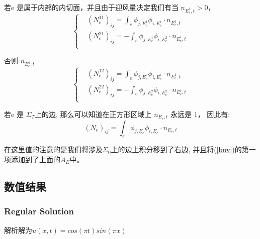 若e 是属于内部的内切面，并且由于迎风量决定我们有当 $n_{E_{e}^1,t}>0$，
$$\left\{
\begin{aligned}
    &(N^{11}_e)_{ij} = \int_e  \phi_{j,E_{e}^1} \phi_{i,E_{e}^1}\cdot n_{E_{e}^1,t}\\
    &(N^{21}_e)_{ij} = -\int_e  \phi_{j,E_{e}^1} \phi_{i,E_{e}^2}\cdot n_{E_{e}^1,t}\\
\end{aligned}
\right.$$

否则 $n_{E_{e}^1,t}$
$$\left\{
\begin{aligned}
    &(N^{12}_e)_{ij} = \int_e  \phi_{j,E_{e}^2} \phi_{i,E_{e}^1}\cdot n_{E_{e}^1,t}\\
    &(N^{22}_e)_{ij} = -\int_e  \phi_{j,E_{e}^2} \phi_{i,E_{e}^2}\cdot n_{E_{e}^1,t}\\
\end{aligned}
\right.$$

若e 是 $\Sigma_T$上的边, 那么可以知道在正方形区域上 $n_{E_{e},t}$ 永远是 1， 因此有:
$$(N_e)_{ij} = \int_e  \phi_{j,E_{e}} \phi_{i,E_{e}}\cdot n_{E_{e},t}$$

在这里值的注意的是我们将涉及$\Sigma_0$上的边上积分移到了右边, 并且将(\ref{buv})的第一项添加到了上面的$A_E$中。
\subsection{数值结果}
\subsubsection{Regular Solution}
解析解为$u(x,t)=cos(\pi t)sin(\pi x)$

